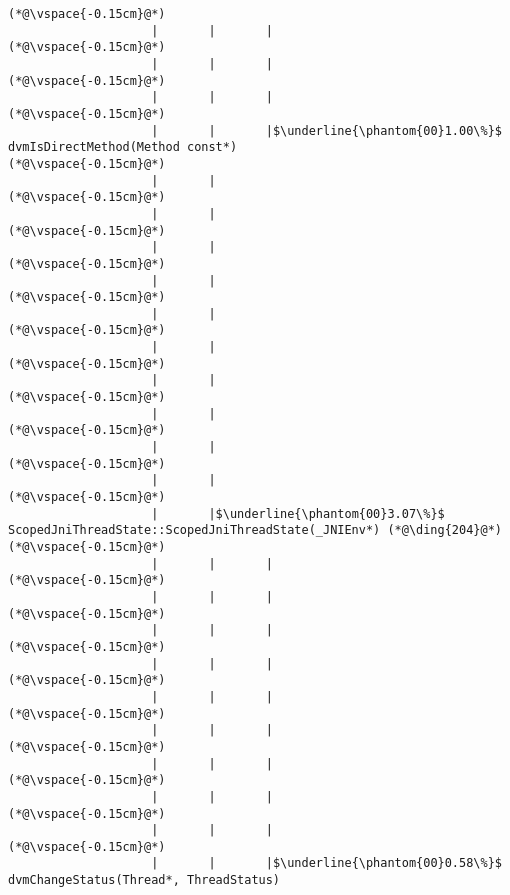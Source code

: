 \begin{lstlisting}[caption=Metodikutsu C$\to$Java 20 int-parametrilla, label=profile:C2JBenchmark00146, numberbychapter=true, frame=lines, float, floatplacement=t]
(*@\vspace{-0.15cm}@*)
                    |       |       |
(*@\vspace{-0.15cm}@*)
                    |       |       |
(*@\vspace{-0.15cm}@*)
                    |       |       |
(*@\vspace{-0.15cm}@*)
                    |       |       |$\underline{\phantom{00}1.00\%}$ dvmIsDirectMethod(Method const*)
(*@\vspace{-0.15cm}@*)
                    |       |
(*@\vspace{-0.15cm}@*)
                    |       |
(*@\vspace{-0.15cm}@*)
                    |       |
(*@\vspace{-0.15cm}@*)
                    |       |
(*@\vspace{-0.15cm}@*)
                    |       |
(*@\vspace{-0.15cm}@*)
                    |       |
(*@\vspace{-0.15cm}@*)
                    |       |
(*@\vspace{-0.15cm}@*)
                    |       |
(*@\vspace{-0.15cm}@*)
                    |       |
(*@\vspace{-0.15cm}@*)
                    |       |
(*@\vspace{-0.15cm}@*)
                    |       |$\underline{\phantom{00}3.07\%}$ ScopedJniThreadState::ScopedJniThreadState(_JNIEnv*) (*@\ding{204}@*)
(*@\vspace{-0.15cm}@*)
                    |       |       |
(*@\vspace{-0.15cm}@*)
                    |       |       |
(*@\vspace{-0.15cm}@*)
                    |       |       |
(*@\vspace{-0.15cm}@*)
                    |       |       |
(*@\vspace{-0.15cm}@*)
                    |       |       |
(*@\vspace{-0.15cm}@*)
                    |       |       |
(*@\vspace{-0.15cm}@*)
                    |       |       |
(*@\vspace{-0.15cm}@*)
                    |       |       |
(*@\vspace{-0.15cm}@*)
                    |       |       |
(*@\vspace{-0.15cm}@*)
                    |       |       |$\underline{\phantom{00}0.58\%}$ dvmChangeStatus(Thread*, ThreadStatus)

\end{lstlisting}
